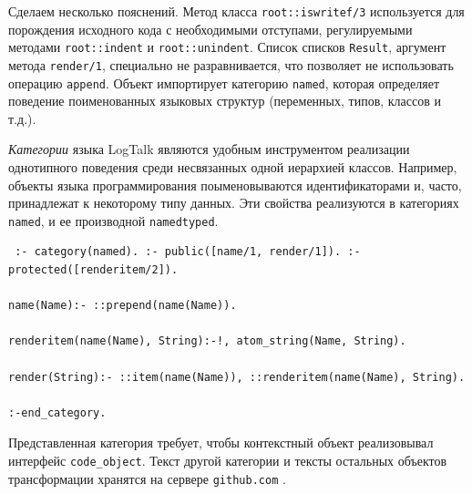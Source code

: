 \documentclass[conference]{IEEEtran} \IEEEoverridecommandlockouts
\begin{document}
Сделаем несколько пояснений. Метод класса \verb|root::iswritef/3| используется для порождения исходного кода с необходимыми отступами, регулируемыми методами \verb|root::indent| и \verb|root::unindent|. Список списков \verb|Result|, аргумент метода \verb|render/1|, специально не разравнивается, что позволяет не использовать операцию \verb|append|. Объект импортирует категорию \verb|named|, которая определяет поведение поименованных языковых структур (переменных, типов, классов и т.д.). 

\emph{Категории} языка LogTalk являются удобным инструментом реализации однотипного поведения среди несвязанных одной иерархией классов. Например, объекты языка программирования поыменовываются идентификаторами и, часто, принадлежат к некоторому типу данных. Эти свойства реализуются в категориях \texttt{named}, и ее производной \texttt{namedtyped}. \begin{verbatim} :- category(named). :- public([name/1, render/1]). :- protected([renderitem/2]). 

name(Name):- ::prepend(name(Name)). 

renderitem(name(Name), String):-!, atom_string(Name, String). 

render(String):- ::item(name(Name)), ::renderitem(name(Name), String). 

:-end_category. \end{verbatim} 

Представленная категория требует, чтобы контекстный объект реализовывал интерфейс \texttt{code\_object}. Текст другой категории и тексты остальных объектов трансформации хранятся на сервере \texttt{github.com} \cite{ghsrc}. 
\end{document}
